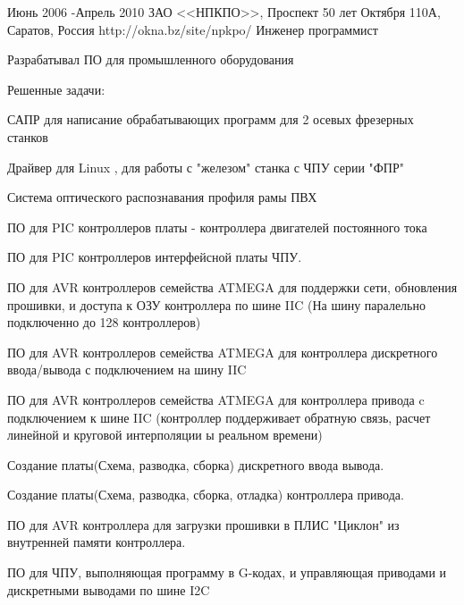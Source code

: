 \job
{Июнь 2006 -}{Апрель 2010}
{ЗАО <<НПКПО>>, Проспект 50 лет Октября 110А, Саратов, Россия}
{http://okna.bz/site/npkpo/}
{Инженер программист}
{Разрабатывал ПО для промышленного оборудования

Решенные задачи:
\begin{itemize-noindent}
\item{САПР для написание обрабатывающих программ для 2 осевых фрезерных станков}
\item{Драйвер для Linux , для работы с "железом" станка с ЧПУ серии "ФПР"}
\item{Система оптического распознавания профиля рамы ПВХ}
\item{ПО для PIC контроллеров платы - контроллера двигателей постоянного тока }
\item{ПО для PIC контроллеров интерфейсной платы ЧПУ. }
\item{ПО для AVR контроллеров семейства ATMEGA для поддержки сети, обновления прошивки, и доступа к ОЗУ контроллера по шине IIC (На шину паралельно подключенно до 128 контроллеров)}
\item{ПО для AVR контроллеров семейства ATMEGA для контроллера дискретного ввода/вывода с подключением на шину IIC }
\item{ПО для AVR контроллеров семейства ATMEGA для контроллера привода c подключением к шине IIC (контроллер поддерживает обратную связь, расчет линейной и круговой интерполяции ы реальном времени) }
\item{Создание платы(Схема, разводка, сборка) дискретного ввода вывода. }
\item{Создание платы(Схема, разводка, сборка, отладка) контроллера привода. }
\item{ПО для AVR контроллера для загрузки прошивки в ПЛИС "Циклон" из внутренней памяти контроллера. }
\item{ПО для ЧПУ, выполняющая программу в G-кодах, и управляющая приводами и дискретными выводами по шине I2C}

\end{itemize-noindent}
}


